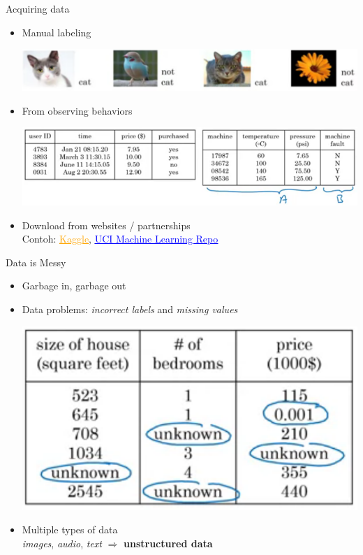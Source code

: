 \documentclass[pdf]{beamer}
\theoremstyle{mystyle}
\begin{document}
\begin{frame}{Acquiring data}
	\begin{itemize}
		\item<2-> Manual labeling
		\begin{center}
			\includegraphics[scale=.3]{manual-labeling}
		\end{center}
		\item<3-> From observing behaviors
		\begin{center}
			\includegraphics[scale=.35]{observing-behaviors}
		\end{center}
		\item<4-> Download from websites / partnerships \\
		Contoh: \href{https://www.kaggle.com/datasets}{\textcolor{orange}{\underline{ Kaggle}}}, \href{http://archive.ics.uci.edu/ml/datasets.php}{\textcolor{blue}{\underline{UCI Machine Learning Repo}}}		
	\end{itemize}
\end{frame}

\begin{frame}{Data is Messy}
	\begin{itemize}
		\item<2-> Garbage in, garbage out
		\item<3-> Data problems: \textit{incorrect labels} and \textit{missing values} 
		\begin{center}
			\includegraphics[scale=.3]{data-problems} 
		\end{center}
		\item<4-> Multiple types of data \\
		\textit{images}, \textit{audio}, \textit{text} $\Rightarrow$ \textbf{unstructured data}					
	\end{itemize}
\end{frame}
\end{document}
